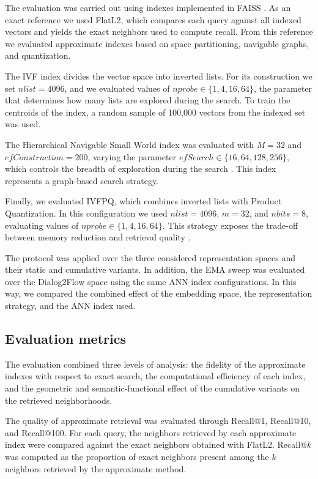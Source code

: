 \documentclass[runningheads]{llncs}
\begin{document}
The evaluation was carried out using indexes implemented in FAISS \cite{johnson2021billion}. As an exact reference we used FlatL2, which compares each query against all indexed vectors and yields the exact neighbors used to compute recall. From this reference we evaluated approximate indexes based on space partitioning, navigable graphs, and quantization.

The IVF index divides the vector space into inverted lists. For its construction we set $nlist=4096$, and we evaluated values of $nprobe \in \{1,4,16,64\}$, the parameter that determines how many lists are explored during the search. To train the centroids of the index, a random sample of 100{,}000 vectors from the indexed set was used.

The Hierarchical Navigable Small World index was evaluated with $M=32$ and $efConstruction=200$, varying the parameter $efSearch \in \{16,64,128,256\}$, which controls the breadth of exploration during the search \cite{malkov2020hnsw}. This index represents a graph-based search strategy.

Finally, we evaluated IVFPQ, which combines inverted lists with Product Quantization. In this configuration we used $nlist=4096$, $m=32$, and $nbits=8$, evaluating values of $nprobe \in \{1,4,16,64\}$. This strategy exposes the trade-off between memory reduction and retrieval quality \cite{jegou2011pq}.

The protocol was applied over the three considered representation spaces and their static and cumulative variants. In addition, the EMA sweep was evaluated over the Dialog2Flow space using the same ANN index configurations. In this way, we compared the combined effect of the embedding space, the representation strategy, and the ANN index used.

\subsection{Evaluation metrics}

The evaluation combined three levels of analysis: the fidelity of the approximate indexes with respect to exact search, the computational efficiency of each index, and the geometric and semantic-functional effect of the cumulative variants on the retrieved neighborhoods.

The quality of approximate retrieval was evaluated through Recall@1, Recall@10, and Recall@100. For each query, the neighbors retrieved by each approximate index were compared against the exact neighbors obtained with FlatL2. Recall@$k$ was computed as the proportion of exact neighbors present among the $k$ neighbors retrieved by the approximate method.
\end{document}
